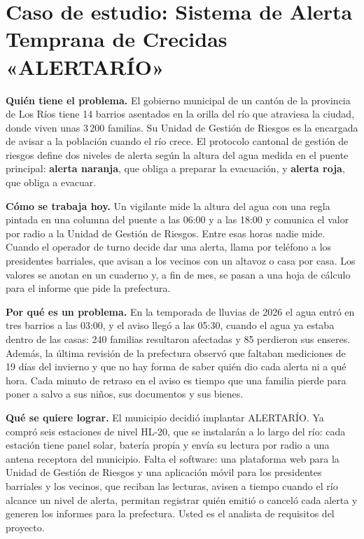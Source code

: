 \documentclass[11pt]{article}
\newcommand{\seccion}[1]{\section{\textcolor{utegreendk}{#1}}}
\begin{document}
\seccion{Caso de estudio: Sistema de Alerta Temprana de Crecidas «ALERTARÍO»}

\begin{cajacaso}[title={El problema que hay que resolver}]
	\textbf{Quién tiene el problema.} El gobierno municipal de un cantón de la provincia de Los Ríos tiene 14 barrios asentados en la orilla del río que atraviesa la ciudad, donde viven unas 3\,200 familias. Su Unidad de Gestión de Riesgos es la encargada de avisar a la población cuando el río crece. El protocolo cantonal de gestión de riesgos define dos niveles de alerta según la altura del agua medida en el puente principal: \textbf{alerta naranja}, que obliga a preparar la evacuación, y \textbf{alerta roja}, que obliga a evacuar.\par\smallskip
	\textbf{Cómo se trabaja hoy.} Un vigilante mide la altura del agua con una regla pintada en una columna del puente a las 06:00 y a las 18:00 y comunica el valor por radio a la Unidad de Gestión de Riesgos. Entre esas horas nadie mide. Cuando el operador de turno decide dar una alerta, llama por teléfono a los presidentes barriales, que avisan a los vecinos con un altavoz o casa por casa. Los valores se anotan en un cuaderno y, a fin de mes, se pasan a una hoja de cálculo para el informe que pide la prefectura.\par\smallskip
	\textbf{Por qué es un problema.} En la temporada de lluvias de 2026 el agua entró en tres barrios a las 03:00, y el aviso llegó a las 05:30, cuando el agua ya estaba dentro de las casas: 240 familias resultaron afectadas y 85 perdieron sus enseres. Además, la última revisión de la prefectura observó que faltaban mediciones de 19 días del invierno y que no hay forma de saber quién dio cada alerta ni a qué hora. Cada minuto de retraso en el aviso es tiempo que una familia pierde para poner a salvo a sus niños, sus documentos y sus bienes.\par\smallskip
	\textbf{Qué se quiere lograr.} El municipio decidió implantar ALERTARÍO. Ya compró seis estaciones de nivel HL-20, que se instalarán a lo largo del río: cada estación tiene panel solar, batería propia y envía su lectura por radio a una antena receptora del municipio. Falta el software: una plataforma web para la Unidad de Gestión de Riesgos y una aplicación móvil para los presidentes barriales y los vecinos, que reciban las lecturas, avisen a tiempo cuando el río alcance un nivel de alerta, permitan registrar quién emitió o canceló cada alerta y generen los informes para la prefectura. Usted es el analista de requisitos del proyecto.
\end{cajacaso}
\end{document}
